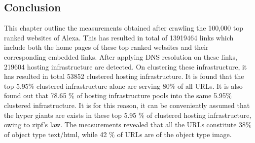 \subsection{Conclusion}
\noindent This chapter outline the measurements obtained after crawling the 100,000 top ranked websites of Alexa. This has resulted in total of 13919464 links which include both the home pages of these top ranked websites and their corresponding embedded links. After applying DNS resolution on these links, 219604 hosting infrastructure are detected. On clustering these infrastructure, it has resulted in total 53852 clustered hosting infrastructure. It is found that the top 5.95\% clustered infrastructure alone are serving 80\% of all URLs. It is also found out that 78.65 \% of hosting infrastructure pools into the same 5.95\% clustered infrastructure. It is for this reason, it can be conveniently assumed that the hyper giants are exists in these top 5.95 \% of clustered hosting infrastructure, owing to zipf's law. The measurements revealed that all the URLs constitute 38\% of object type text/html, while 42 \% of URLs are of the object type image.\\
